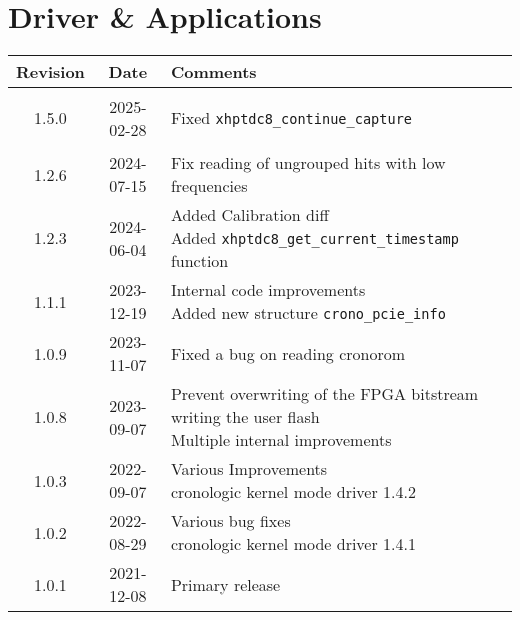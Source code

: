 \section{Driver \& Applications} \label{sec:driver}
\begin{tabularx}{\textwidth}{|c|c|X|}
    \hline
    Revision & Date & Comments\\
    \hline\hline
    \hypertarget{drvrev}{1.5.0} & 2025-02-28 &
    \makecell[l]{
        Fixed \texttt{xhptdc8\_continue\_capture}\\*
    }\\
    \hline
    1.2.6 & 2024-07-15 &
    \makecell[l]{
        Fix reading of ungrouped hits with low frequencies\\*
    }\\
    \hline
    1.2.3 & 2024-06-04 &
    \makecell[l]{
        Added Calibration diff\\*
        Added \texttt{xhptdc8\_get\_current\_timestamp} function\\*
    }\\
    \hline
    1.1.1 & 2023-12-19 &
    \makecell[l]{
        Internal code improvements\\*
        Added new structure \texttt{crono\_pcie\_info}
    }\\
    \hline
    1.0.9 & 2023-11-07 & Fixed a bug on reading cronorom   \\
    \hline
    1.0.8 & 2023-09-07 &
    \makecell[l]{
        Prevent overwriting of the FPGA bitstream writing the user flash\\*
        Multiple internal improvements
    }\\
    \hline
    1.0.3 & 2022-09-07 &
    \makecell[l]{
        Various Improvements\\*
        cronologic kernel mode driver 1.4.2
    }\\
    \hline
    1.0.2 & 2022-08-29 &
    \makecell[l]{
        Various bug fixes\\*
        cronologic kernel mode driver 1.4.1
    }\\
    \hline
    1.0.1 & 2021-12-08 & Primary release\\
    \hline
\end{tabularx}